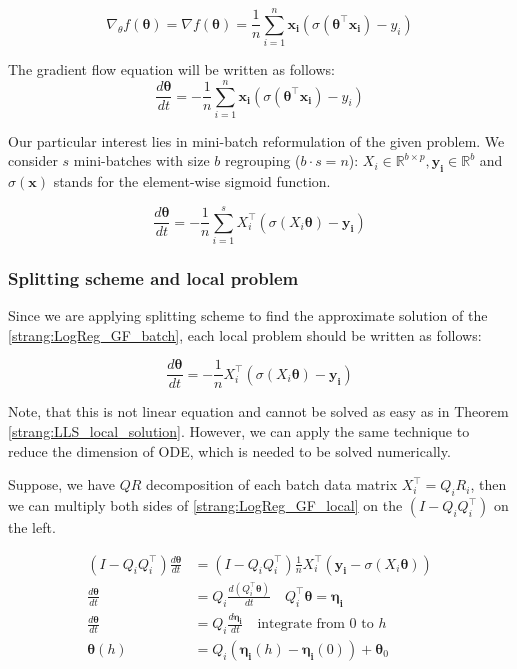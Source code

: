 \documentclass{article}
\newcommand{\vect}[1]{\boldsymbol{\mathbf{#1}}}
\begin{document}
\begin{equation}\label{strang:LogReg_grad}
\nabla_\theta f(\vect{\theta}) = \nabla f(\vect{\theta}) = \frac{1}{n}\sum\limits_{i=1}^n \vect{x_i}(\sigma(\vect{\theta}^\top\vect{x_i}) - y_i)
\end{equation}

The gradient flow equation will be written as follows:
\begin{equation}\label{strang:LogReg_GF}
\frac{d \vect{\theta}}{d t} = - \frac{1}{n}\sum\limits_{i=1}^n \vect{x_i}(\sigma(\vect{\theta}^\top\vect{x_i}) - y_i)
\end{equation}

Our particular interest lies in mini-batch reformulation of the given problem. We consider $s$ mini-batches with size $b$ regrouping ($b \cdot s = n$): $X_i \in \mathbb{R}^{b \times p}, \vect{y_i} \in \mathbb{R}^{b}$ and  $\sigma(\vect{x})$ stands for the element-wise sigmoid function.

\begin{equation}\label{strang:LogReg_GF_batch}
\frac{d \vect{\theta}}{d t} = - \frac{1}{n}\sum\limits_{i=1}^s X_i^\top\left(\sigma\left(X_i\vect{\theta}\right) - \vect{y_i}\right)
\end{equation}

\subsubsection{Splitting scheme and local problem}

Since we are applying splitting scheme to find the approximate solution of the \eqref{strang:LogReg_GF_batch}, each local problem should be written as follows:

\begin{equation}\label{strang:LogReg_GF_local}
\frac{d \vect{\theta}}{d t} =  - \frac{1}{n} X_i^\top\left(\sigma\left(X_i\vect{\theta}\right) - \vect{y_i}\right)
\end{equation}

Note, that this is not linear equation and cannot be solved as easy as in Theorem \ref{strang:LLS_local_solution}. However, we can apply the same technique to reduce the dimension of ODE, which is needed to be solved numerically. 

Suppose, we have $QR$ decomposition of each batch data matrix $X_i^\top = Q_i R_i$, then we can multiply both sides of \eqref{strang:LogReg_GF_local} on the $(I - Q_iQ_i^\top)$ on the left. 

\begin{align}
\nonumber (I - Q_iQ_i^\top)\frac{d \vect{\theta}}{d t} &= (I - Q_iQ_i^\top) \frac{1}{n} X_i^\top(\vect{y_i} -\sigma\left(X_i\vect{\theta}\right)) \\
\nonumber \frac{d \vect{\theta}}{d t} &= Q_i\frac{d (Q_i^\top\vect{\theta})}{d t} \quad Q_i^\top \vect{\theta} = \vect{\eta_i}\\ 
\nonumber \frac{d \vect{\theta}}{d t} &= Q_i\frac{d \vect{\eta_i}}{d t} \quad \text{integrate from $0$ to $h$}\\ 
\label{strang:logreg_theta_from_eta}\vect{\theta}(h) &= Q_i \left(\vect{\eta_i}(h) - \vect{\eta_i}(0) \right) + \vect{\theta}_0
\end{align}
\end{document}
